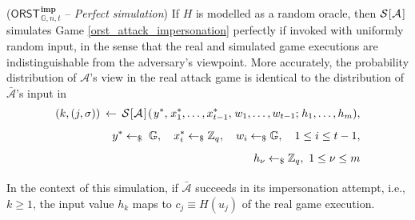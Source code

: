 \documentclass{iacrtrans}
\begin{document}
\begin{prop}\label{orst_simulated_impersonation_attack_prop}
\textup{($\mathsf{ORST}
	_{\hspace{1pt}\mathbb{G}, n, t}
	^{\hspace{1pt}\mathbf{imp}}
$
-- \textit{Perfect simulation})}
If $H$ is modelled as a random oracle, then
$
\mathcal{S}
		\hspace{.5pt}
		[
			\hspace{0.5pt}
			\mathcal{A}
			\hspace{1pt}
		]
$
simulates Game \textup{\ref{orst_attack_impersonation}} perfectly
if invoked with uniformly random input,
in the sense that the real and simulated game executions
are indistinguishable from the adversary's viewpoint.
More accurately, the probability distribution of $\mathcal{A}$'s view
in the real attack game
is identical to the distribution of $\mathcal{\bar{A}}$'s
input in
\vspace{6pt}
\begin{equation}\label{orst_attack_simulated}
\begin{split}
(k, (j, \sigma)) \hspace{2pt}\leftarrow\hspace{2pt} \mathcal{S}
		\hspace{.5pt}
		[
			\hspace{0.5pt}
			\mathcal{A}
			\hspace{1pt}
		]
		\hspace{1pt}
		(
			\hspace{1pt}
			y ^*,
			\hspace{1pt}
			x_1^*, \dots, x_{t-1}^*,
			\hspace{1pt}
			w_1, \dots, w_{t-1};
			\hspace{1pt}
			h_1, \dots, h_m
		),\\[5pt]
y^* \leftarrow_\$ \hspace{3pt}\mathbb{G},
\ \ \ x_i^* \leftarrow_\$ \mathbb{Z}_q,
\ \ \ w_i \leftarrow_\$ \mathbb{G},
\ \ \ 1 \le i \le t - 1,\\[5pt]
h_\nu \leftarrow_\$ \mathbb{Z}_q,\ 1 \le \nu \le m\\[6pt]
\end{split}
\end{equation}
In the context of this simulation, if $\mathcal{\bar{A}}$
succeeds in its impersonation attempt,
i.e., $k \ge 1$, the input value $h_k$ maps
to $c_j \equiv H(u_j)$ of the real game execution.
\end{prop}
\end{document}
